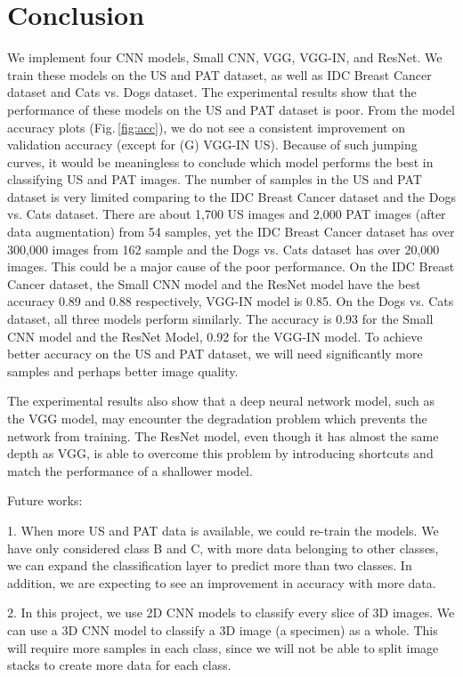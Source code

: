 \chapter{Conclusion} 
\label{conclusion}

We implement four CNN models, Small CNN, VGG, VGG-IN, and ResNet. We train these models on the US and PAT dataset, as well as IDC Breast Cancer dataset and Cats vs. Dogs dataset. The experimental results show that the performance of these models on the US and PAT dataset is poor. From the model accuracy plots (Fig.\,\ref{fig:acc}), we do not see a consistent improvement on validation accuracy (except for (G) VGG-IN US). Because of such jumping curves, it would be meaningless to conclude which model performs the best in classifying US and PAT images. The number of samples in the US and PAT dataset is very limited comparing to the IDC Breast Cancer dataset and the Dogs vs. Cats dataset. There are about 1,700 US images and 2,000 PAT images (after data augmentation) from 54 samples, yet the IDC Breast Cancer dataset has over 300,000 images from 162 sample and the Dogs vs. Cats dataset has over 20,000 images. This could be a major cause of the poor performance.
On the IDC Breast Cancer dataset, the Small CNN model and the ResNet model have the best accuracy 0.89 and 0.88 respectively, VGG-IN model is 0.85. On the Dogs vs. Cats dataset, all three models perform similarly. The accuracy is 0.93 for the Small CNN model and the ResNet Model, 0.92 for the VGG-IN model. 
To achieve better accuracy on the US and PAT dataset, we will need significantly more samples and perhaps better image quality.

The experimental results also show that a deep neural network model, such as the VGG model, may encounter the degradation problem which prevents the network from training. The ResNet model, even though it has almost the same depth as VGG, is able to overcome this problem by introducing shortcuts and match the performance of a shallower model. 

Future works:

1. When more US and PAT data is available, we could re-train the models. We have only considered class B and C, with more data belonging to other classes, we can expand the classification layer to predict more than two classes. In addition, we are expecting to see an improvement in accuracy with more data.

2. In this project, we use 2D CNN models to classify every slice of 3D images. We can use a 3D CNN model \citep{tran2015learning} to classify a 3D image (a specimen) as a whole. This will require more samples in each class, since we will not be able to split image stacks to create more data for each class.